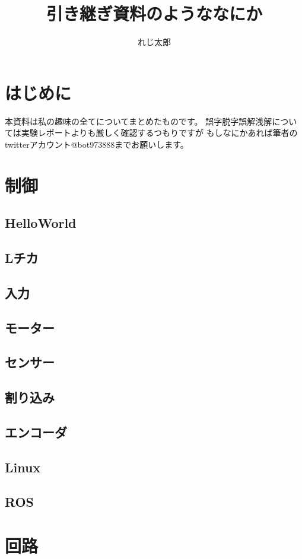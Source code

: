 \documentclass{jarticle}
\begin{document}
\title{引き継ぎ資料のようななにか}
\author{れじ太郎}

\maketitle

\tableofcontents
\clearpage

\section{はじめに}
本資料は私の趣味の全てについてまとめたものです。
誤字脱字誤解浅解については実験レポートよりも厳しく確認するつもりですが
もしなにかあれば筆者のtwitterアカウント@bot973888までお願いします。
\section{制御}
   \subsection{HelloWorld}
   \subsection{Lチカ}
   \subsection{入力}
   \subsection{モーター}
   \subsection{センサー}
   \subsection{割り込み}
   \subsection{エンコーダ}
   \subsection{Linux}
   \subsection{ROS}
\section{回路}
\end{document}
